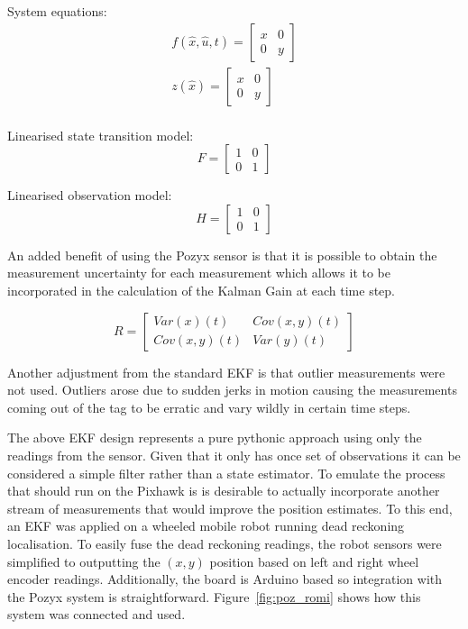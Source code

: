 System equations:
\begin{equation*}
    \begin{split}
        f(\hat{x},\hat{u},t) = \left[ \begin{array}{cc}
                              x & 0\\
                              0 & y
        \end{array} \right]\\
        z(\hat{x}) = \left[ \begin{array}{cc}
                              x & 0\\
                              0 & y
        \end{array} \right]\\
    \end{split}
\end{equation*}


Linearised state transition model:
\[
    F =
    \left[ \begin{array}{cc}
    1 & 0\\
    0 & 1
    \end{array}
    \right]
\]

Linearised observation model:
\[
    H =
    \left[ \begin{array}{cc}
    1 & 0\\
    0 & 1
    \end{array}
    \right]
\]

An added benefit of using the Pozyx sensor is that it is possible to obtain the measurement uncertainty for each measurement which allows it to be incorporated in the calculation of the Kalman Gain at each time step.

\[
    R =
%
        \left[
            \begin{array}{cc}
                Var(x)(t) & Cov(x,y)(t)\\
                Cov(x,y)(t) & Var(y)(t)
            \end{array}
        \right]
\]

Another adjustment from the standard EKF is that outlier measurements were not used.
Outliers arose due to sudden jerks in motion causing the measurements coming out of the tag to be erratic and vary wildly in certain time steps.

The above EKF design represents a pure pythonic approach using only the readings from the sensor.
Given that it only has once set of observations it can be considered a simple filter rather than a state estimator.
To emulate the process that should run on the Pixhawk is is desirable to actually incorporate another stream of measurements that would improve the position estimates.
To this end, an EKF was applied on a wheeled mobile robot running dead reckoning localisation.
To easily fuse the dead reckoning readings, the robot sensors were simplified to outputting the $(x,y)$ position based on left and right wheel encoder readings.
Additionally, the board is Arduino based so integration with the Pozyx system is straightforward.
Figure~\ref{fig:poz_romi} shows how this system was connected and used.


